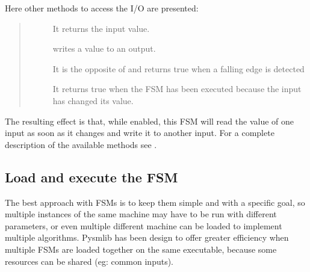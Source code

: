 \documentclass[letterpaper,10pt,english]{sphinxmanual}
\begin{document}
%
\begin{sphinxVerbatim}[commandchars=\\\{\}]
 
       
     
          
\end{sphinxVerbatim}

Here other methods to access the I/O are presented:
\begin{quote}
\begin{description}
\item[{}] \leavevmode
It returns the input value.

\item[{}] \leavevmode
writes a value to an output.

\item[{}] \leavevmode
It is the opposite of  and returns true when a
falling edge is detected

\item[{}] \leavevmode
It returns true when the FSM has been executed because the
input has changed its value.

\end{description}
\end{quote}

The resulting effect is that, while enabled, this FSM will read
the value of one input as soon as it changes and write it to another input.
For a complete description of the available methods see {\hyperref[\detokenize{io:accessing-io}]{}}.


\subsection{Load and execute the FSM}
\label{\detokenize{overview:load-and-execute-the-fsm}}
The best approach with FSMs is to keep them simple and with a specific goal, so
multiple instances of the same machine may have to be run with different
parameters, or even multiple different machine can be loaded to implement
multiple algorithms. Pysmlib has been design to offer greater efficiency when
multiple FSMs are loaded together on the same executable, because some resources
can be shared (eg: common inputs).
\end{document}
